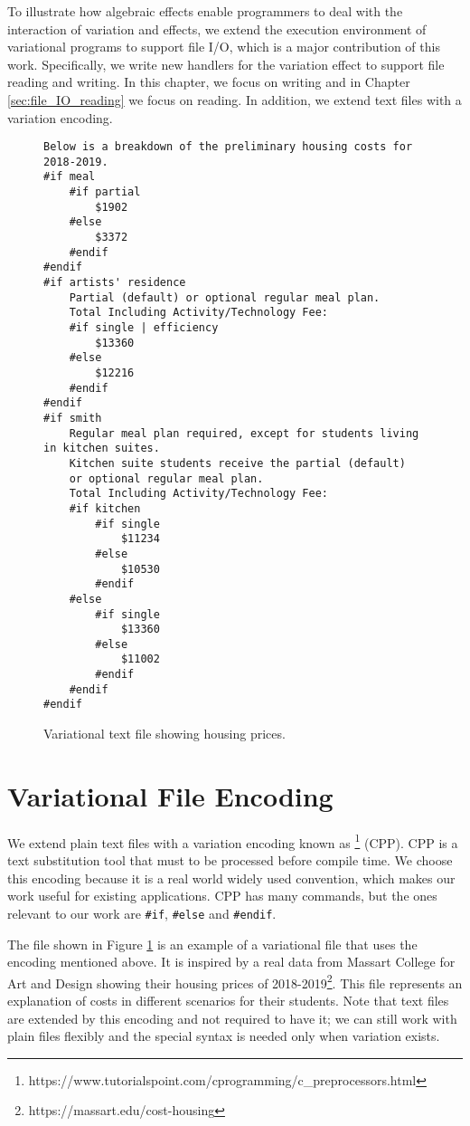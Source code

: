 To illustrate how algebraic effects enable programmers to deal with the interaction of variation and effects, we extend the execution environment of variational programs to support file I/O, which is a major contribution of this work. Specifically, we write new handlers for the variation effect to support file reading and writing. In this chapter, we focus on writing and in Chapter \ref{sec:file_IO_reading} we focus on reading. In addition, we extend text files with a variation encoding.

\begin{figure}[!h]
\begin{lstlisting}
Below is a breakdown of the preliminary housing costs for 2018-2019.
#if meal
    #if partial
        $1902
    #else
        $3372
    #endif
#endif
#if artists' residence
    Partial (default) or optional regular meal plan. 
    Total Including Activity/Technology Fee:
    #if single | efficiency
        $13360
    #else
        $12216
    #endif
#endif
#if smith
    Regular meal plan required, except for students living in kitchen suites. 
    Kitchen suite students receive the partial (default) 
    or optional regular meal plan.
    Total Including Activity/Technology Fee:
    #if kitchen
        #if single
            $11234
        #else
            $10530
        #endif
    #else
        #if single 
            $13360
        #else
            $11002
        #endif
    #endif
#endif
\end{lstlisting}
  \caption{Variational text file showing housing prices.}
  \label{fig:file_example}
\end{figure}

\section{Variational File Encoding}
\label{sec:file_format}

We extend plain text files with a variation encoding known as \footnote{https://www.tutorialspoint.com/cprogramming/c\_preprocessors.html} (CPP). CPP is a text substitution tool that must to be processed before compile time. We choose this encoding because it is a real world widely used convention, which makes our work useful for existing applications. CPP has many commands, but the ones relevant to our work are \texttt{\#if}, \texttt{\#else} and \texttt{\#endif}. 

The file shown in Figure \ref{fig:file_example} is an example of a variational file that uses the encoding mentioned above. It is inspired by a real data from Massart College for Art and Design showing their housing prices of 2018-2019\footnote{https://massart.edu/cost-housing}. This file represents an explanation of costs in different scenarios for their students. Note that text files are extended by this encoding and not required to have it; we can still work with plain files flexibly and the special syntax is needed only when variation exists. 

